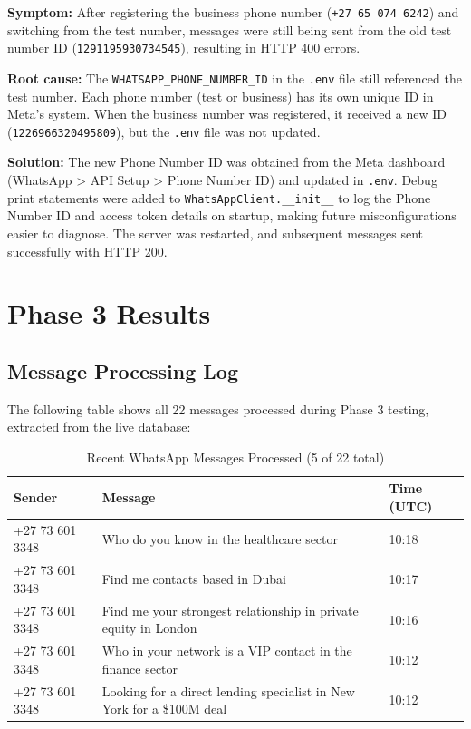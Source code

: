 \documentclass[12pt, a4paper]{report}
\begin{document}
\textbf{Symptom:} After registering the business phone number (\texttt{+27 65 074 6242}) and switching from the test number, messages were still being sent from the old test number ID (\texttt{1291195930734545}), resulting in HTTP 400 errors.

\textbf{Root cause:} The \texttt{WHATSAPP\_PHONE\_NUMBER\_ID} in the \texttt{.env} file still referenced the test number. Each phone number (test or business) has its own unique ID in Meta's system. When the business number was registered, it received a new ID (\texttt{1226966320495809}), but the \texttt{.env} file was not updated.

\textbf{Solution:} The new Phone Number ID was obtained from the Meta dashboard (WhatsApp > API Setup > Phone Number ID) and updated in \texttt{.env}. Debug print statements were added to \texttt{WhatsAppClient.\_\_init\_\_} to log the Phone Number ID and access token details on startup, making future misconfigurations easier to diagnose. The server was restarted, and subsequent messages sent successfully with HTTP 200.

\section{Phase 3 Results}

\subsection{Message Processing Log}

The following table shows all 22 messages processed during Phase 3 testing, extracted from the live database:

\begin{table}[H]
\centering
\begin{tabular}{p{3cm}p{8cm}p{3cm}}
\toprule
\textbf{Sender} & \textbf{Message} & \textbf{Time (UTC)} \\
\midrule
+27 73 601 3348 & Who do you know in the healthcare sector & 10:18 \\
+27 73 601 3348 & Find me contacts based in Dubai & 10:17 \\
+27 73 601 3348 & Find me your strongest relationship in private equity in London & 10:16 \\
+27 73 601 3348 & Who in your network is a VIP contact in the finance sector & 10:12 \\
+27 73 601 3348 & Looking for a direct lending specialist in New York for a \$100M deal & 10:12 \\
\bottomrule
\end{tabular}
\caption{Recent WhatsApp Messages Processed (5 of 22 total)}
\end{table}
\end{document}

